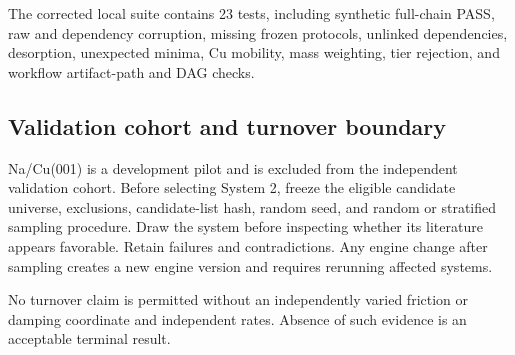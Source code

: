 The corrected local suite contains 23 tests, including synthetic full-chain PASS,
raw and dependency corruption, missing frozen protocols, unlinked dependencies,
desorption, unexpected minima, Cu mobility, mass weighting, tier rejection, and
workflow artifact-path and DAG checks.

\subsection*{Validation cohort and turnover boundary}

Na/Cu(001) is a development pilot and is excluded from the independent
validation cohort.  Before selecting System 2, freeze the eligible candidate
universe, exclusions, candidate-list hash, random seed, and random or stratified
sampling procedure.  Draw the system before inspecting whether its literature
appears favorable.  Retain failures and contradictions.  Any engine change after
sampling creates a new engine version and requires rerunning affected systems.

No turnover claim is permitted without an independently varied friction or
damping coordinate and independent rates.  Absence of such evidence is an
acceptable terminal result.
